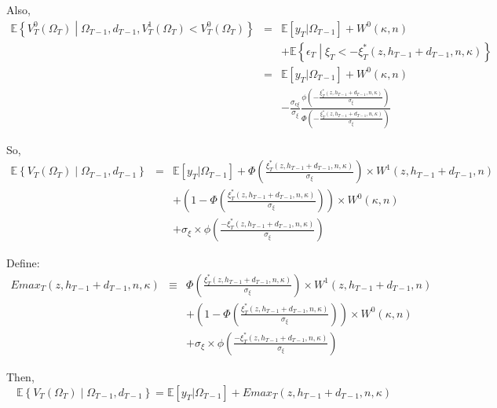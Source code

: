 \noindent Also,
\begin{eqnarray*}
\mathbb{E} \left\{ V^{0}_T\left(\Omega_T\right) \middle| \Omega_{T-1}, d_{T-1}, V^{1}_T\left(\Omega_T\right) < V^{0}_T\left(\Omega_T\right) \right\}
&=& \mathbb{E} [y_T | \Omega_{T-1}] + W^0\left(\kappa, n\right) \\
& & + \mathbb{E} \left\{\epsilon_T \middle| \xi_T < -\xi^*_T\left(z, h_{T-1} + d_{T-1}, n, \kappa \right) \right\}\\
&=& \mathbb{E} [y_T | \Omega_{T-1}] + W^0\left(\kappa, n\right) \\
& & - \frac{\sigma_{\epsilon \xi}}{\sigma_\xi} \frac{\phi\left(-\frac{\xi^*_T\left(z,h_{T-1}+d_{T-1},n,\kappa\right)}{\sigma_\xi}\right)}{\Phi\left(-\frac{\xi^*_T\left(z,h_{T-1}+d_{T-1},n,\kappa\right)}{\sigma_\xi}\right)}
\end{eqnarray*}

\noindent So, 
\begin{eqnarray*}
\mathbb{E} \left\{ V_T\left(\Omega_T\right) \middle| \Omega_{T-1}, d_{T-1}\right\} &=& \mathbb{E} [y_T | \Omega_{T-1}] + \Phi\left( \frac{\xi^*_T\left(z,h_{T-1}+d_{T-1},n,\kappa\right)}{\sigma_\xi}\right) \times W^1\left( z,h_{T-1}+d_{T-1},n \right) \\
& & + \left(1 - \Phi\left( \frac{\xi^*_T\left(z,h_{T-1}+d_{T-1},n,\kappa\right)}{\sigma_\xi}\right) \right) \times  W^0\left(\kappa, n\right) \\
& & + \sigma_\xi \times \phi\left( \frac{- \xi^*_T\left(z,h_{T-1}+d_{T-1},n,\kappa\right)}{\sigma_\xi}\right)
\end{eqnarray*}

\noindent Define: 
\begin{eqnarray*}
Emax_T\left(z,h_{T-1}+d_{T-1},n,\kappa\right) &\equiv & \Phi\left( \frac{\xi^*_T\left(z,h_{T-1}+d_{T-1},n,\kappa\right)}{\sigma_\xi}\right) \times W^1\left( z,h_{T-1}+d_{T-1},n \right) \\
& & + \left(1 - \Phi\left( \frac{\xi^*_T\left(z,h_{T-1}+d_{T-1},n,\kappa\right)}{\sigma_\xi}\right) \right) \times  W^0\left(\kappa, n\right) \\
& & + \sigma_\xi \times \phi\left( \frac{- \xi^*_T\left(z,h_{T-1}+d_{T-1},n,\kappa\right)}{\sigma_\xi}\right) 
\end{eqnarray*}

\noindent Then,
\begin{equation*}
\mathbb{E} \left\{ V_T\left(\Omega_T\right) \middle| \Omega_{T-1}, d_{T-1}\right\} = \mathbb{E} [y_T | \Omega_{T-1}]  + Emax_T\left(z,h_{T-1}+d_{T-1},n,\kappa\right)  
\end{equation*}

